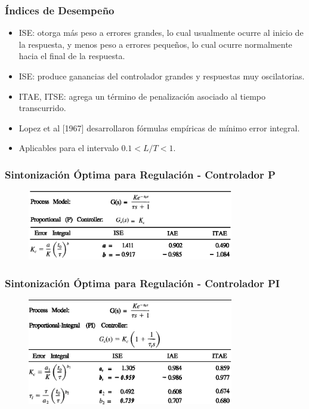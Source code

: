 \documentclass[aspectratio=169,handout]{beamer}
\theoremstyle{definition}
\theoremstyle{plain}
\theoremstyle{remark}
\begin{document}
\begin{frame}[<+->]\frametitle{Índices de Desempeño}
	\begin{itemize}
		\item ISE: otorga más peso a errores grandes, lo cual usualmente ocurre al inicio de la respuesta, y menos peso a errores pequeños, lo cual ocurre normalmente hacia el final de la respuesta.
		\item ISE: produce ganancias del controlador grandes y respuestas muy oscilatorias.
		\item ITAE, ITSE: agrega un término de penalización asociado al tiempo transcurrido.
		\item Lopez et al [1967] desarrollaron fórmulas empíricas de mínimo error integral.
		\item Aplicables para el intervalo $0.1 < L/T < 1$.
	\end{itemize}
\end{frame}

\begin{frame}[<+->]\frametitle{Sintonización Óptima para Regulación - Controlador P}
\begin{figure}
	\includegraphics[width=9cm]{images/criteriosOptimosP.eps}
\end{figure}
\end{frame}

\begin{frame}[<+->]\frametitle{Sintonización Óptima para Regulación - Controlador PI}
\begin{figure}
	\includegraphics[width=9cm]{images/criteriosOptimosPI.eps}
\end{figure}
\end{frame}
\end{document}
